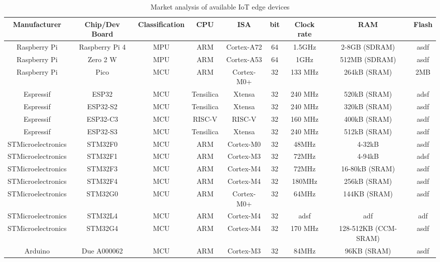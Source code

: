 \begin{sidewaystable}[]
	\centering
	\begin{tabular}{c|c|c|c|c|c|c|c|c}

	\textbf{Manufacturer} 	& \textbf{Chip/Dev Board} & \textbf{Classification} & \textbf{CPU} & \textbf{ISA} & \textbf{bit} & \textbf{Clock rate} & \textbf{RAM} & \textbf{Flash} \\
	\hline
	\hline
	Raspberry Pi          	& Raspberry Pi 4   	& MPU  	& ARM          & Cortex-A72   	& 64    	& 1.5GHz		& 2-8GB (SDRAM)		& asdf\\
	Raspberry Pi          	& Zero 2 W          	& MPU   	& ARM          & Cortex-A53   	& 64     	& 1GHz		& 512MB (SDRAM)		& asdf\\
	Raspberry Pi          	& Pico           		& MCU   	& ARM          & Cortex-M0+   	& 32 	& 133 MHz 	& 264kB (SRAM)	 	& 2MB\\
	\hline
	Espressif             		& ESP32               & MCU   	& Tensilica    	& Xtensa       		& 32		& 240 MHz	& 520kB (SRAM)		& adsf\\
	Espressif             		& ESP32-S2    	& MCU   	& Tensilica    	& Xtensa       		& 32		& 240 MHz	& 320kB (SRAM)		& asdf\\
	Espressif             		& ESP32-C3    	& MCU   	& RISC-V       & RISC-V       	& 32		& 160 MHz	& 400kB (SRAM)		& asdf\\
	Espressif             		& ESP32-S3     	& MCU   	& Tensilica    	& Xtensa       		& 32		& 240 MHz	& 512kB (SRAM)		& asdf\\
	\hline
	STMicroelectronics  	& STM32F0     	& MCU   	& ARM          & Cortex-M0    	& 32		& 48MHz		& 4-32kB				& asdf\\
	STMicroelectronics  	& STM32F1     	& MCU 	& ARM          & Cortex-M3    	& 32		& 72MHz		& 4-94kB				& adsf\\
	STMicroelectronics  	& STM32F3       	& MCU  	& ARM          & Cortex-M4    	& 32		& 72MHz		& 16-80kB (SRAM)		& asdf\\
	STMicroelectronics  	& STM32F4       	& MCU  	& ARM          & Cortex-M4    	& 32		& 180MHz	& 256kB (SRAM)		& asdf\\ %
	STMicroelectronics  	& STM32G0        	& MCU  	& ARM          & Cortex-M0+   	& 32		& 64MHz		& 144KB (SRAM)		& asdf\\
	STMicroelectronics  	& STM32L4       	& MCU   	& ARM          & Cortex-M4    	& 32		& adsf		& adf 				& adf\\ %
	STMicroelectronics  	& STM32G4       	& MCU   	& ARM          & Cortex-M4    	& 32		& 170 MHz	& 128-512KB (CCM-SRAM)& asdf\\ %
	\hline
	Arduino               		& Due A000062    	& MCU  	& ARM          & Cortex-M3    	& 32       & 84MHz		& 96KB (SRAM)		& asdf \\         
	\end{tabular}
	\caption{Market analysis of available IoT edge devices}
	\label{tab:market}
\end{sidewaystable}

